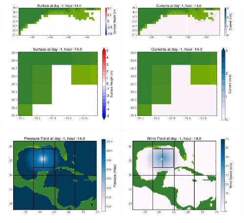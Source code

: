 \documentclass[11pt]{article}
\begin{document}
\includegraphics[width=0.475\textwidth]{frame0034fig4.png}
\vskip 10pt 
\includegraphics[width=0.475\textwidth]{frame0034fig5.png}
\includegraphics[width=0.475\textwidth]{frame0034fig6.png}
\vskip 10pt 
\includegraphics[width=0.475\textwidth]{frame0034fig7.png}
\includegraphics[width=0.475\textwidth]{frame0034fig8.png}
\vskip 10pt 
\includegraphics[width=0.475\textwidth]{frame0034fig9.png}
\end{document}
